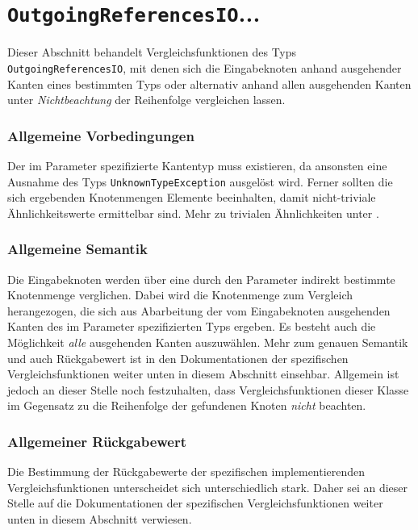 %
%

\section{\texttt{OutgoingReferencesIO}...}
\label{strct:spec:outrefsio}
Dieser Abschnitt behandelt Vergleichsfunktionen des Typs \texttt{OutgoingReferencesIO}, mit denen sich die Eingabeknoten anhand ausgehender Kanten eines bestimmten Typs oder alternativ anhand allen ausgehenden Kanten unter \emph{Nichtbeachtung} der Reihenfolge vergleichen lassen.

\subsubsection*{Allgemeine Vorbedingungen}
Der im Parameter spezifizierte Kantentyp muss existieren, da ansonsten eine Ausnahme des Typs \texttt{UnknownTypeException} ausgelöst wird. Ferner sollten die sich ergebenden Knotenmengen Elemente beeinhalten, damit nicht-triviale Ähnlichkeitswerte ermittelbar sind. Mehr zu trivialen Ähnlichkeiten unter .

\subsubsection*{Allgemeine Semantik}
Die Eingabeknoten werden über eine durch den Parameter indirekt bestimmte Knotenmenge verglichen. Dabei wird die Knotenmenge zum Vergleich herangezogen, die sich aus Abarbeitung der vom Eingabeknoten ausgehenden Kanten des im Parameter spezifizierten Typs ergeben. Es besteht auch die Möglichkeit \emph{alle} ausgehenden Kanten auszuwählen. Mehr zum genauen Semantik und auch Rückgabewert ist in den Dokumentationen der spezifischen Vergleichsfunktionen weiter unten in diesem Abschnitt einsehbar. Allgemein ist jedoch an dieser Stelle noch festzuhalten, dass Vergleichsfunktionen dieser Klasse im Gegensatz zu  die Reihenfolge der gefundenen Knoten \emph{nicht} beachten.

\subsubsection*{Allgemeiner Rückgabewert}
Die Bestimmung der Rückgabewerte der spezifischen implementierenden Vergleichsfunktionen unterscheidet sich unterschiedlich stark. Daher sei an dieser Stelle auf die Dokumentationen der spezifischen Vergleichsfunktionen weiter unten in diesem Abschnitt verwiesen.

